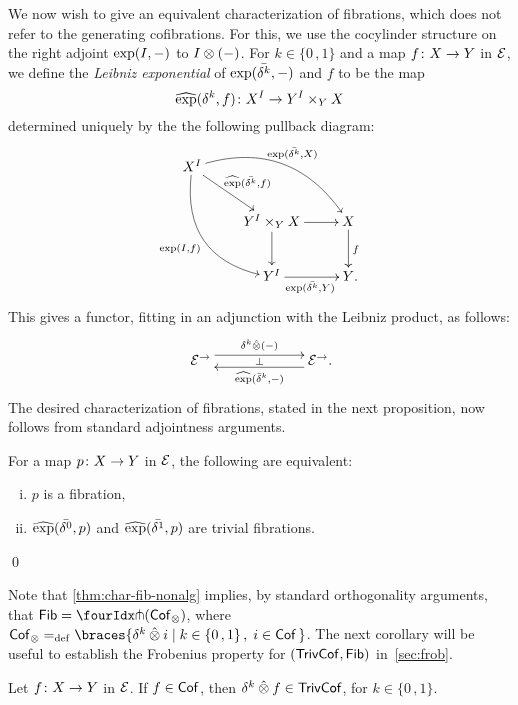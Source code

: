 \documentclass[reqno,10pt,a4paper,oneside,draft]{amsart}
\begin{document}
We now wish to give an equivalent characterization of fibrations, which does not refer to the generating
cofibrations. For this, we use the cocylinder structure on the right adjoint $\exp(\interval, -)$ to $\interval \otimes (-)$.
For $k \in \{ 0 \, , 1 \}$ and a map $f \co X \to Y$ in $\calE$, we define the \emph{Leibniz exponential} of
$\exp(\bar{\kcyl}, -)$ and $f$ to be the map
\[
\hatexp(\kcyl, f) \co X^\interval \to Y^\interval \times_{Y} X
\]
determined uniquely by the the following pullback diagram:
\[
\xymatrix{
X^\interval \ar@/^2pc/[drr]^-{\exp(\bar{\kcyl}, X)}  \ar@/_2pc/[ddr]_{\exp(\interval, f)} \ar[dr]^-{\hatexp(\bar{\kcyl}, f)} &  & \\
  &   Y^\interval \times_{Y} X    \ar[d] \ar[r]  & X \ar[d]^f \\
  & Y^\interval \ar[r]_{\exp(\bar{\kcyl}, Y)} & Y \rlap{.} }
  \]
This gives a functor, fitting in an adjunction with the Leibniz product, as follows:
\begin{equation}
\label{equ:leibniz-prod-exp}
\xymatrix@C+4em{
  \catE^\to
  \ar@<1ex>[r]^{\kcyl \hatotimes (-)}
  \ar@{}[r]|{\bot}
&
  \catE^\to
  \ar@<1ex>[l]^{\hatexp(\bar{\delta}^k, -)}
\rlap{.}}
\end{equation}
The desired characterization of fibrations, stated in the next proposition, now follows from standard adjointness arguments.


\begin{proposition} \label{thm:char-fib-nonalg} For a map $p \co X \to Y$ in $\cal{E}$, the following are equivalent:
\begin{enumerate}[(i)]
\item $p$ is a fibration,
\item $\hatexp(\bar{\lcyl}, p)$ and $\hatexp(\bar{\rcyl}, p)$ are trivial fibrations.
\end{enumerate} \qed
\end{proposition}

Note that \cref{thm:char-fib-nonalg} implies, by standard orthogonality arguments, that $\Fib = \liftr{(\Cof_\otimes)}$, where 
$\Cof_\otimes \defeq \braces{\delta^k \hatotimes i \mid  k \in \{ 0 \, , 1 \} \, , \;  i \in \Cof \,  }$. The next corollary will be useful to establish the Frobenius property for $(\TrivCof, \Fib)$ in~\cref{sec:frob}. 

\begin{corollary} 
\label{thm:kcyl-of-cof-is-trivcof-non-alg} Let $f \co X \to Y$ in $\cal{E}$. 
If $f \in \Cof$, then $\kcyl \hatotimes f \in \TrivCof$, for $k \in \{0 \, , 1 \}$.
\end{corollary}
\end{document}
